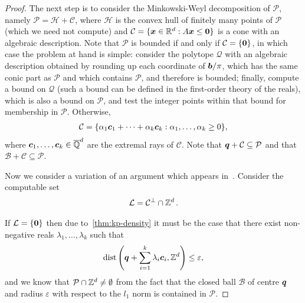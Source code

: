 \begin{proof}
The next step is to consider the Minkowski-Weyl decomposition of $\mathcal{P}$, namely $\mathcal{P} = \mathcal{H} + \mathcal{C}$, where $\mathcal{H}$ is the convex hull of finitely many points of $\mathcal{P}$ (which we need not compute) and $\mathcal{C} = \lbrace \boldsymbol{x} \in \mathbb{R}^{d}: A \boldsymbol{x} \leq \boldsymbol{0} \rbrace$ is a cone with an algebraic description.
Note that $\mathcal{P}$ is bounded if and only if $\mathcal{C} = \lbrace \boldsymbol{0} \rbrace$, in which case the problem at hand is simple: consider the polytope $\mathcal{Q}$ with an algebraic description obtained by rounding up each coordinate of $\boldsymbol{b} / \pi$, which has the same conic part as $\mathcal{P}$ and which contains $\mathcal{P}$, and therefore is bounded; finally, compute a bound on $\mathcal{Q}$ (such a bound can be defined in the first-order theory of the reals), which is also a bound on $\mathcal{P}$, and test the integer points within that bound for membership in $\mathcal{P}$. Otherwise,
\begin{align*}
\mathcal{C} = \lbrace \alpha_{1} \boldsymbol{c}_{1} + \cdots + \alpha_{k} \boldsymbol{c}_{k}: \alpha_{1}, \ldots, \alpha_{k} \geq 0 \rbrace,
\end{align*}
where $\boldsymbol{c}_{1}, \ldots, \boldsymbol{c}_{k} \in \overline{\mathbb{Q}}^{d}$ are the extremal rays of $\mathcal{C}$. Note that $\boldsymbol{q} + \mathcal{C} \subseteq \mathcal{P}$ and that $\mathcal{B} + \mathcal{C} \subseteq \mathcal{P}$.

Now we consider a variation of an argument which appears in~\cite{KhachiyanP97}. Consider the computable set
\begin{align*}
{\mathcal{L}} = \mathcal{C}^{\perp} \cap \mathbb{Z}^{d} \, .
\end{align*}

If ${\mathcal{L}} = \lbrace \boldsymbol{0} \rbrace$ then due to~\cref{thm:kp-density} it must be the case that there exist non-negative reals $\lambda_{1}, \ldots, \lambda_{k}$ such that
\begin{align*}
\operatorname{dist} \left(\boldsymbol{q} + \sum\limits_{i=1}^{k} \lambda_{i} \boldsymbol{c}_{i}, \mathbb{Z}^{d} \right) \leq \varepsilon ,
\end{align*}
and we know that $\mathcal{P} \cap \mathbb{Z}^{d} \neq \emptyset$ from the fact that the closed ball $\mathcal{B}$ of centre $\boldsymbol{q}$ and radius $\varepsilon$ with respect to the $l_{1}$ norm is contained in $\mathcal{P}$.


\end{proof}
